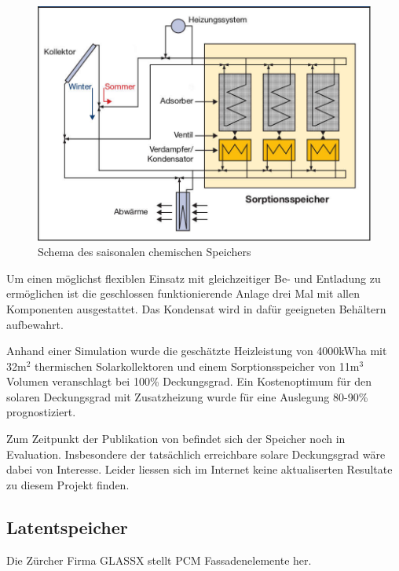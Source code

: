 \documentclass[11pt,a4paper]{scrartcl}
\begin{document}
{\begin{figure}[h!]
\begin{center}
\includegraphics[scale=1]{images/energiehaus.jpg}
\caption{Schema des saisonalen chemischen Speichers \cite{BINE2}}
\label{fig:Saisonaler Speicher}
\end{center}
\end{figure}

Um einen möglichst flexiblen Einsatz mit gleichzeitiger Be- und Entladung zu
ermöglichen ist die geschlossen funktionierende Anlage drei Mal mit allen
Komponenten ausgestattet. Das Kondensat wird in dafür geeigneten Behältern
aufbewahrt. 

Anhand einer Simulation wurde die geschätzte Heizleistung von 4000kWh\/a mit
32m$^2$ thermischen Solarkollektoren und einem Sorptionsspeicher von 11m$^3$
Volumen veranschlagt bei 100\% Deckungsgrad. Ein Kostenoptimum für den solaren
Deckungsgrad mit Zusatzheizung wurde für eine Auslegung 80-90\% prognostiziert.

Zum Zeitpunkt der Publikation von \cite{BINE2} befindet sich der Speicher noch
in Evaluation. Insbesondere der tatsächlich erreichbare solare Deckungsgrad wäre
dabei von Interesse. Leider liessen sich im Internet keine aktualiserten
Resultate zu diesem Projekt finden.
\subsection{Latentspeicher}
Die Zürcher Firma GLASSX stellt PCM Fassadenelemente her. 

}
\end{document}
